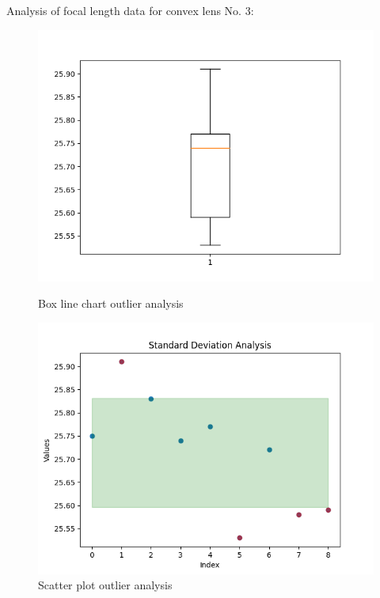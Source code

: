 \documentclass[UTF8]{article}
\begin{document}
        Analysis of focal length data for convex lens No. 3:
        \begin{figure}[H]
                          			\begin{minipage}[t]{0.5\linewidth}
                          				\centering
                          				\includegraphics[clip,scale=0.45,trim={0 0 0 0}]{fig/fig17.png}
                          				\caption{Box line chart outlier analysis}
                          				\label{figure.17}
                          			\end{minipage}
                          			\begin{minipage}[t]{0.5\linewidth}
                          				\centering
                          				\includegraphics[clip,scale=0.45,trim={0 0 0 0}]{fig/fig18.png}
                          				\caption{Scatter plot outlier analysis}
                          				\label{figure.18}
                          			\end{minipage}
                          		\end{figure}
                          		
\end{document}
